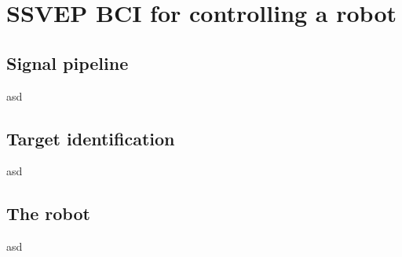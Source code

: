 
\chapter{SSVEP BCI for controlling a robot}
\section{Signal pipeline}
asd
\section{Target identification}
asd
\section{The robot}
asd
